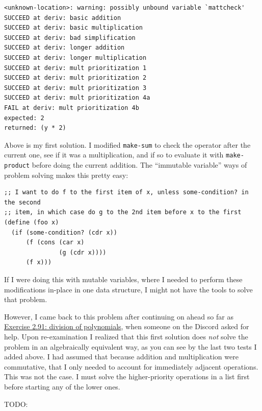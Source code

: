 \documentclass[final,fleqn,titlepage,twoside]{article}
\begin{document}
\begin{verbatim}
<unknown-location>: warning: possibly unbound variable `mattcheck'
SUCCEED at deriv: basic addition
SUCCEED at deriv: basic multiplication
SUCCEED at deriv: bad simplification
SUCCEED at deriv: longer addition
SUCCEED at deriv: longer multiplication
SUCCEED at deriv: mult prioritization 1
SUCCEED at deriv: mult prioritization 2
SUCCEED at deriv: mult prioritization 3
SUCCEED at deriv: mult prioritization 4a
FAIL at deriv: mult prioritization 4b
expected: 2
returned: (y * 2)
\end{verbatim}

Above is my first solution. I modified \texttt{make-sum} to
check the operator after the current one, see if it was a multiplication, and
if so to evaluate it with \texttt{make-product} before doing the current
addition. The ``immutable variable'' ways of problem solving makes this pretty
easy:

\begin{verbatim}
;; I want to do f to the first item of x, unless some-condition? in the second
;; item, in which case do g to the 2nd item before x to the first
(define (foo x)
  (if (some-condition? (cdr x))
      (f (cons (car x)
               (g (cdr x))))
      (f x)))
\end{verbatim}

If I were doing this with mutable variables, where I needed to perform these
modifications in-place in one data structure, I might not have the tools to
solve that problem.

However, I came back to this problem after continuing on ahead so far as \hyperref[sec:orgda8f430]{Exercise 2.91: division of polynomials}, when someone on the
Discord asked for help. Upon re-examination I realized that this first solution
does \emph{not} solve the problem in an algebraically equivalent way, as you can see
by the last two tests I added above. I had assumed that because addition and
multiplication were commutative, that I only needed to account for immediately
adjacent operations. This was not the case. I must solve the higher-priority
operations in a list first before starting any of the lower ones.

TODO:
\end{document}

